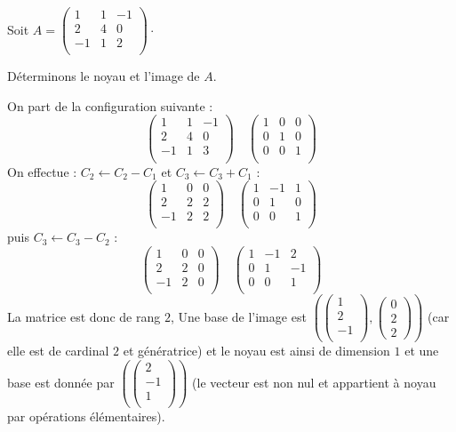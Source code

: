\documentclass[french,11pt,twoside]{VcCours}
\begin{document}
\begin{Exemple} Soit $A = \begin{pmatrix}
1 & 1 & -1 \\
2 & 4 & 0 \\
-1 & 1 & 2 \\
\end{pmatrix} \cdot$

Déterminons le noyau et l'image de $A$. 

On part de la configuration suivante :
$$ \begin{pmatrix}
1 & 1 & -1 \\
2 & 4 & 0 \\
-1 & 1 & 3 \\
\end{pmatrix} \quad \begin{pmatrix}
1 & 0 & 0 \\
0 & 1 & 0 \\
0 & 0 & 1 \\
\end{pmatrix}$$
On effectue : $C_2 \leftarrow C_2-C_1$ et $C_3 \leftarrow C_3+C_1$ :
$$ \begin{pmatrix}
1 & 0 & 0 \\
2 & 2 & 2 \\
-1 & 2 & 2 \\
\end{pmatrix} \quad \begin{pmatrix}
1 & -1 & 1 \\
0 & 1 & 0 \\
0 & 0 & 1 \\
\end{pmatrix}$$
puis $C_3 \leftarrow C_3-C_2$ :
$$ \begin{pmatrix}
1 & 0 & 0 \\
2 & 2 & 0 \\
-1 & 2 & 0 \\
\end{pmatrix} \quad \begin{pmatrix}
1 & -1 & 2 \\
0 & 1 & -1 \\
0 & 0 & 1 \\
\end{pmatrix}$$
La matrice est donc de rang $2$, Une base de l'image est $\left( \begin{pmatrix}
1 \\
2 \\
-1 \\
\end{pmatrix}, \begin{pmatrix}
0 \\
2 \\
2 
\end{pmatrix} \right)$ (car elle est de cardinal $2$ et génératrice) et le noyau est ainsi de dimension $1$ et une base est donnée par $\left( \begin{pmatrix}
2 \\
-1 \\
1 \\
\end{pmatrix} \right)$ (le vecteur est non nul et appartient à noyau par opérations élémentaires).
\newpage


\end{Exemple}
\end{document}
